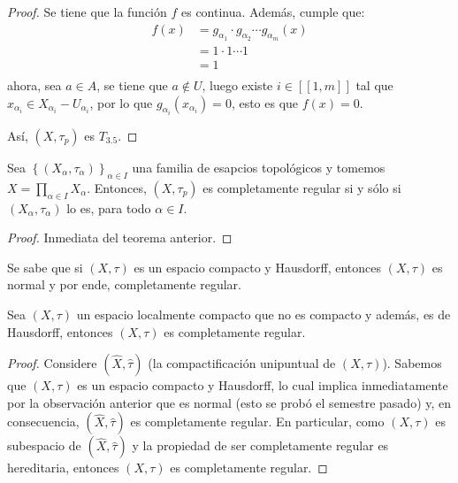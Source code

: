 \documentclass[12pt]{report}
\theoremstyle{largebreak}
\newcommand\natint[1]{\ensuremath{\left[\!\left[ #1\right]\!\right]}}
\begin{document}
\begin{proof}
        Se tiene que la función $f$ es continua. Además, cumple que:
        \begin{equation*}
            \begin{split}
                f(x)&=g_{\alpha_1}\cdot g_{\alpha_2}\cdots g_{\alpha_m}(x)\\
                &=1\cdot 1\cdots 1\\
                &=1\\
            \end{split}
        \end{equation*}
        ahora, sea $a\in A$, se tiene que $a\notin U$, luego existe $i\in\natint{1,m}$ tal que $x_{\alpha_i}\in X_{\alpha_i}-U_{\alpha_i}$, por lo que $g_{\alpha_i}(x_{\alpha_i})=0$, esto es que $f(x)=0$.

        Así, $(X,\tau_p)$ es $T_{3.5}$.
    \end{proof}

    \begin{cor}
        Sea $\left\{(X_\alpha,\tau_\alpha) \right\}_{ \alpha\in I}$ una familia de esapcios topológicos y tomemos $X=\prod_{ \alpha\in I}X_\alpha$. Entonces, $(X,\tau_p)$ es completamente regular si y sólo si $(X_\alpha,\tau_\alpha)$ lo es, para todo $\alpha\in I$.
    \end{cor}

    \begin{proof}
        Inmediata del teorema anterior.
    \end{proof}

    \begin{obs}
        Se sabe que si $(X,\tau)$ es un espacio compacto y Hausdorff, entonces $(X,\tau)$ es normal y por ende, completamente regular.
    \end{obs}

    \begin{propo}
        Sea $(X,\tau)$ un espacio localmente compacto que no es compacto y además, es de Hausdorff, entonces $(X,\tau)$ es completamente regular.
    \end{propo}

    \begin{proof}
        Considere $(\hat{X},\hat{\tau})$ (la compactificación unipuntual de $(X,\tau)$). Sabemos que $(X,\tau)$ es un espacio compacto y Hausdorff, lo cual implica inmediatamente por la observación anterior que es normal (esto se probó el semestre pasado) y, en consecuencia, $(\hat{X},\hat{\tau})$ es completamente regular. En particular, como $(X,\tau)$ es subespacio de $(\hat{X},\hat{\tau})$ y la propiedad de ser completamente regular es hereditaria, entonces $(X,\tau)$ es completamente regular.
    \end{proof}
\end{document}
